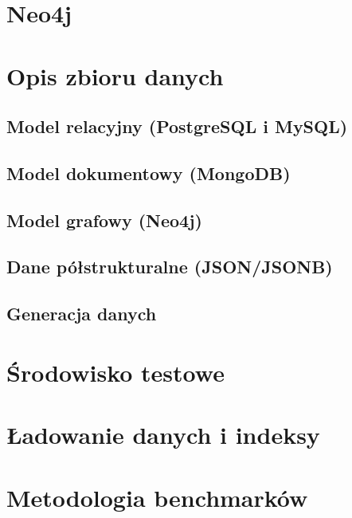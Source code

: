 \documentclass{template}
\begin{document}
\section{Neo4j}


\section{Opis zbioru danych}
\subsection{Model relacyjny (PostgreSQL i MySQL)}


\subsection{Model dokumentowy (MongoDB)}


\subsection{Model grafowy (Neo4j)}


\subsection{Dane półstrukturalne (JSON/JSONB)}


\subsection{Generacja danych}


\section{Środowisko testowe}


\section{Ładowanie danych i indeksy}


\section{Metodologia benchmarków}

\end{document}
